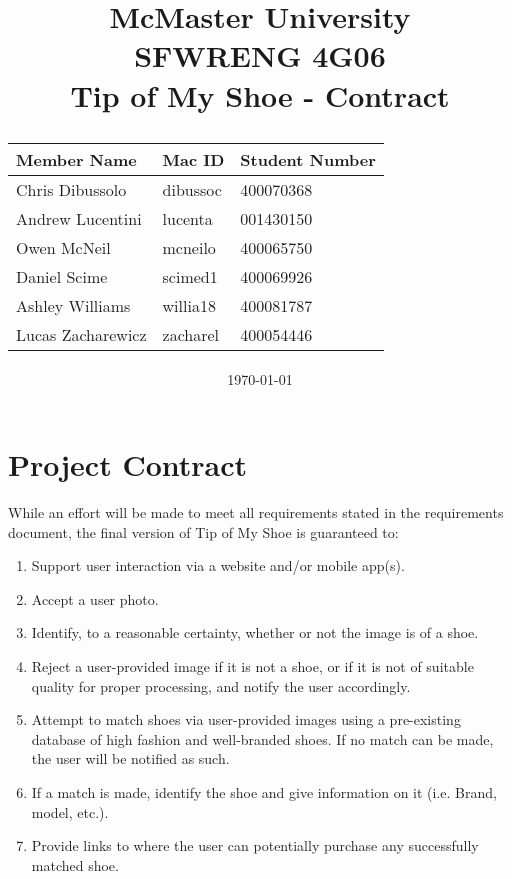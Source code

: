 \documentclass[12pt, titlepage]{article}
\title{
McMaster University\\
SFWRENG 4G06\\
\bigskip\bigskip\bigskip
{\bf Tip of My Shoe - Contract\\}
\bigskip\bigskip\bigskip\bigskip
\begin{table}[h!]
\begin{center}
\begin{tabular}{|p{5cm}|p{5cm}|p{5cm}|}
	\hline
	\bf Member Name & \bf Mac ID & \bf Student Number\\
	\hline
	\hline
	Chris Dibussolo & dibussoc & 400070368\\
	\hline
    Andrew Lucentini & lucenta & 001430150\\
    \hline
	Owen McNeil & mcneilo & 400065750 \\
	\hline
	Daniel Scime & scimed1 & 400069926\\
	\hline
    Ashley Williams & willia18 & 400081787\\
	\hline
      Lucas Zacharewicz & zacharel & 400054446\\
	\hline
\end{tabular}
\end{center}
\end{table}
\date{\today}
}
\begin{document}
\maketitle
\newpage


\section{Project Contract}

While an effort will be made to meet all requirements stated in the requirements document, the final version of Tip of My Shoe is guaranteed to:

\begin{enumerate}
    \item Support user interaction via a website and/or mobile app(s).
    \item Accept a user photo.
    \item Identify, to a reasonable certainty, whether or not the image is of a shoe.
    \item Reject a user-provided image if it is not a shoe, or if it is not of suitable quality for proper processing, and notify the user accordingly.
    \item Attempt to match shoes via user-provided images using a pre-existing database of high fashion and well-branded shoes. If no match can be made, the user will be notified as such.
    \item If a match is made, identify the shoe and give information on it (i.e. Brand, model, etc.).
    \item Provide links to where the user can potentially purchase any successfully matched shoe.
\end{enumerate}
\end{document}
